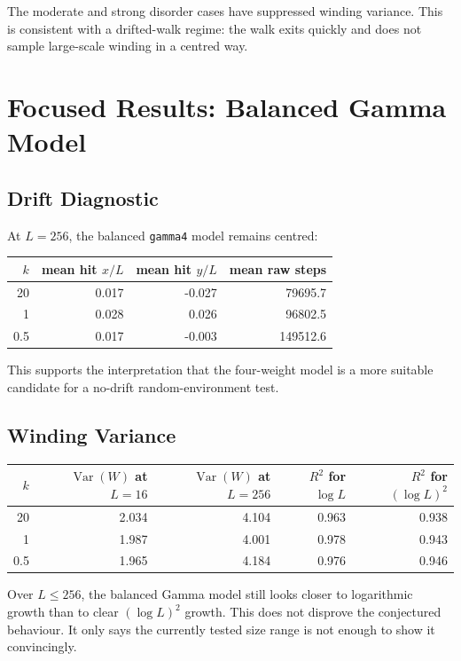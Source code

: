 \documentclass[11pt]{article}
\begin{document}
The moderate and strong disorder cases have suppressed winding variance. This
is consistent with a drifted-walk regime: the walk exits quickly and does not
sample large-scale winding in a centred way.

\section{Focused Results: Balanced Gamma Model}

\subsection{Drift Diagnostic}

At $L=256$, the balanced \texttt{gamma4} model remains centred:

\begin{center}
\begin{tabular}{rrrr}
\toprule
$k$ & mean hit $x/L$ & mean hit $y/L$ & mean raw steps \\
\midrule
20  & 0.017 & -0.027 & 79695.7 \\
1   & 0.028 & 0.026  & 96802.5 \\
0.5 & 0.017 & -0.003 & 149512.6 \\
\bottomrule
\end{tabular}
\end{center}

This supports the interpretation that the four-weight model is a more suitable
candidate for a no-drift random-environment test.

\subsection{Winding Variance}

\begin{center}
\begin{tabular}{rrrrr}
\toprule
$k$ & $\operatorname{Var}(W)$ at $L=16$ &
$\operatorname{Var}(W)$ at $L=256$ &
$R^2$ for $\log L$ &
$R^2$ for $(\log L)^2$ \\
\midrule
20  & 2.034 & 4.104 & 0.963 & 0.938 \\
1   & 1.987 & 4.001 & 0.978 & 0.943 \\
0.5 & 1.965 & 4.184 & 0.976 & 0.946 \\
\bottomrule
\end{tabular}
\end{center}

Over $L\leq 256$, the balanced Gamma model still looks closer to logarithmic
growth than to clear $(\log L)^2$ growth. This does not disprove the conjectured
behaviour. It only says the currently tested size range is not enough to show
it convincingly.
\end{document}
